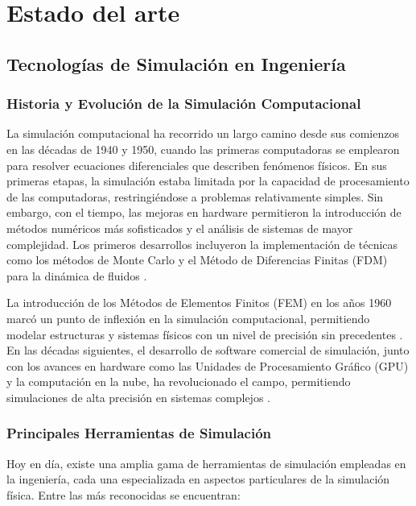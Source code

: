 \chapter{Estado del arte}

\section{Tecnologías de Simulación en Ingeniería}

\subsection{Historia y Evolución de la Simulación Computacional}

La simulación computacional ha recorrido un largo camino desde sus comienzos en las décadas de 1940 y 1950, cuando las primeras computadoras se emplearon para resolver ecuaciones diferenciales que describen fenómenos físicos. En sus primeras etapas, la simulación estaba limitada por la capacidad de procesamiento de las computadoras, restringiéndose a problemas relativamente simples. Sin embargo, con el tiempo, las mejoras en hardware permitieron la introducción de métodos numéricos más sofisticados y el análisis de sistemas de mayor complejidad. Los primeros desarrollos incluyeron la implementación de técnicas como los métodos de Monte Carlo y el Método de Diferencias Finitas (FDM) para la dinámica de fluidos \cite{metropolis1949monte}. 

La introducción de los Métodos de Elementos Finitos (FEM) en los años 1960 marcó un punto de inflexión en la simulación computacional, permitiendo modelar estructuras y sistemas físicos con un nivel de precisión sin precedentes \cite{zienkiewicz1967finite}. En las décadas siguientes, el desarrollo de software comercial de simulación, junto con los avances en hardware como las Unidades de Procesamiento Gráfico (GPU) y la computación en la nube, ha revolucionado el campo, permitiendo simulaciones de alta precisión en sistemas complejos \cite{owen2014computational}.

\subsection{Principales Herramientas de Simulación}

Hoy en día, existe una amplia gama de herramientas de simulación empleadas en la ingeniería, cada una especializada en aspectos particulares de la simulación física. Entre las más reconocidas se encuentran:

